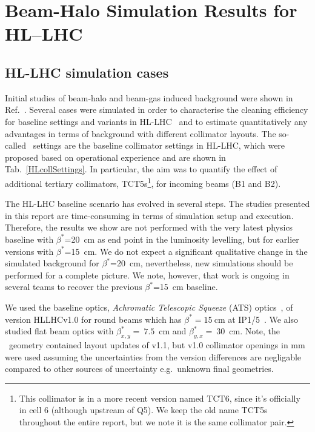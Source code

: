 \section{Beam-Halo Simulation Results for HL--LHC\label{hllhcResults}}


\subsection{HL-LHC simulation cases}

Initial studies of beam-halo and beam-gas induced background were shown in Ref.~\cite{kweeIpac14,ipac2015_rkh}. Several cases were simulated in order to characterise the cleaning efficiency for baseline settings and variants in HL-LHC~\cite{HLPDR2014,HLTDR2015} and to estimate quantitatively any advantages in terms of background with different collimator layouts. The so-called \twosigmaret~settings are the baseline collimator settings in HL-LHC, which were proposed based on operational experience \cite{collSettRef} and are shown in Tab.~\ref{HLcollSettings}. In particular, the aim was to quantify the effect of additional tertiary collimators, TCT5s\footnote{This collimator is in a more recent version named TCT6, since it's officially in cell 6 (although upstream of Q5). We keep the old name TCT5s throughout the entire report, but we note it is the same collimator pair.}, for incoming beams (B1 and B2).%

The HL-LHC baseline scenario has evolved in several steps. The studies presented in this report are time-consuming in terms of simulation setup and execution. Therefore, the results we show are not performed with the very latest physics baseline with $\beta^*$=20~cm as end point in the luminosity levelling, but for earlier versions with $\beta^*$=15~cm. We do not expect a significant qualitative change in the simulated background for $\beta^*$=20~cm, nevertheless, new simulations should be performed for a complete picture. We note, however, that work is ongoing in several teams to recover the previous $\beta^*$=15~cm baseline.

We used the baseline optics, \textit{Achromatic Telescopic Squeeze} (ATS) optics~\cite{ATSref}, of version HLLHCv1.0 for round beams which has $\beta^* = 15~$cm at IP1/5~\cite{opticsWebRef}. We also studied flat beam optics with $\beta^*_{x,y} =~7.5$~cm and $\beta^*_{y,x} =~30$~cm. Note, the \fluka~geometry contained layout updates of v1.1, but v1.0 collimator openings in mm were used assuming the uncertainties from the version differences are negligable compared to other sources of uncertainty e.g.~unknown final geometries. 

